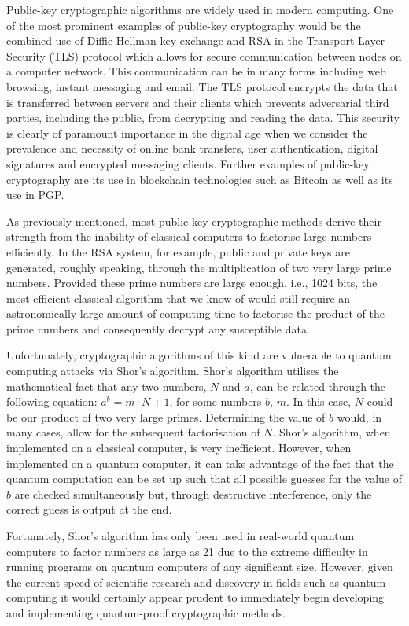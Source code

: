 \documentclass[journal]{IEEEtran}
\begin{document}
Public-key cryptographic algorithms are widely used in modern computing. One of the most prominent examples of public-key cryptography would be the combined use of Diffie-Hellman key exchange and RSA in the Transport Layer Security (TLS) protocol which allows for secure communication between nodes on a computer network. This communication can be in many forms including web browsing, instant messaging and email. The TLS protocol encrypts the data that is transferred between servers and their clients which prevents adversarial third parties, including the public, from decrypting and reading the data. This security is clearly of paramount importance in the digital age when we consider the prevalence and necessity of online bank transfers, user authentication, digital signatures and encrypted messaging clients. Further examples of public-key cryptography are its use in blockchain technologies such as Bitcoin as well as its use in PGP.

As previously mentioned, most public-key cryptographic methods derive their strength from the inability of classical computers to factorise large numbers efficiently. In the RSA system, for example, public and private keys are generated, roughly speaking, through the multiplication of two very large prime numbers. Provided these prime numbers are large enough, i.e., 1024 bits, the most efficient classical algorithm that we know of would still require an astronomically large amount of computing time to factorise the product of the prime numbers and consequently decrypt any susceptible data.

Unfortunately, cryptographic algorithms of this kind are vulnerable to quantum computing attacks via Shor's algorithm. Shor's algorithm utilises the mathematical fact that any two numbers, $N$ and $a$, can be related through the following equation: $a^b = m \cdot N + 1$, for some numbers $b$, $m$. In this case, $N$ could be our product of two very large primes. Determining the value of $b$ would, in many cases, allow for the subsequent factorisation of $N$. Shor's algorithm, when implemented on a classical computer, is very inefficient. However, when implemented on a quantum computer, it can take advantage of the fact that the quantum computation can be set up such that all possible guesses for the value of $b$ are checked simultaneously but, through destructive interference, only the correct guess is output at the end.

Fortunately, Shor's algorithm has only been used in real-world quantum computers to factor numbers as large as 21 due to the extreme difficulty in running programs on quantum computers of any significant size\cite{shor:martinlopez}. However, given the current speed of scientific research and discovery in fields such as quantum computing it would certainly appear prudent to immediately begin developing and implementing quantum-proof cryptographic methods.
\end{document}
